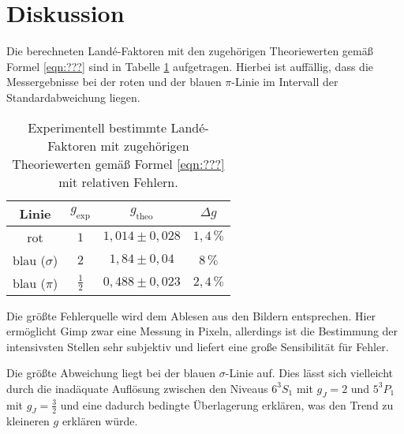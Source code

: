 \section{Diskussion}
\label{sec:Diskussion}
Die berechneten Landé-Faktoren mit den zugehörigen Theoriewerten gemäß Formel \eqref{eqn:???}
sind in Tabelle \ref{tab:result} aufgetragen.
Hierbei ist auffällig, dass die Messergebnisse bei der roten und der blauen $\pi$-Linie
im Intervall der Standardabweichung liegen.
\begin{table} 
	\centering 
	\caption{Experimentell bestimmte Landé-Faktoren mit zugehörigen Theoriewerten gemäß Formel \eqref{eqn:???} mit relativen Fehlern.} 
	 \label{tab:result} 
	 \begin{tabular}{c | c | c | c} 
	 	\toprule 
		 Linie & $g_{\text{exp}}$ & $g_{\text{theo}}$ & $\Delta g$ \\ 
		\midrule 
		rot & $1$ & $1,014\pm0,028$ & $1,4\, \si{\percent}$ \\ 
		blau ($\sigma$) & $2$ & $1,84\pm0,04$ & $8 \, \si{\percent}$ \\ 
		blau ($\pi$)    & $\frac{1}{2}$ & $0,488\pm0,023$ & $2,4\,\si{\percent}$ \\
		\bottomrule 
	\end{tabular} 
\end{table}
Die größte Fehlerquelle wird dem Ablesen aus den Bildern entsprechen. Hier ermöglicht 
Gimp \cite{gimp} zwar eine Messung in Pixeln, allerdings ist die Bestimmung der intensivsten 
Stellen sehr subjektiv und liefert eine große Sensibilität für Fehler.

Die größte Abweichung liegt bei der blauen $\sigma$-Linie auf. Dies lässt sich vielleicht durch
die inadäquate Auflösung zwischen den Niveaus $6^3S_1$ mit $g_J=2$ und $5^3P_1$ mit $g_J=\frac{3}{2}$ und eine dadurch bedingte Überlagerung erklären, was den Trend zu kleineren $g$ erklären würde.


